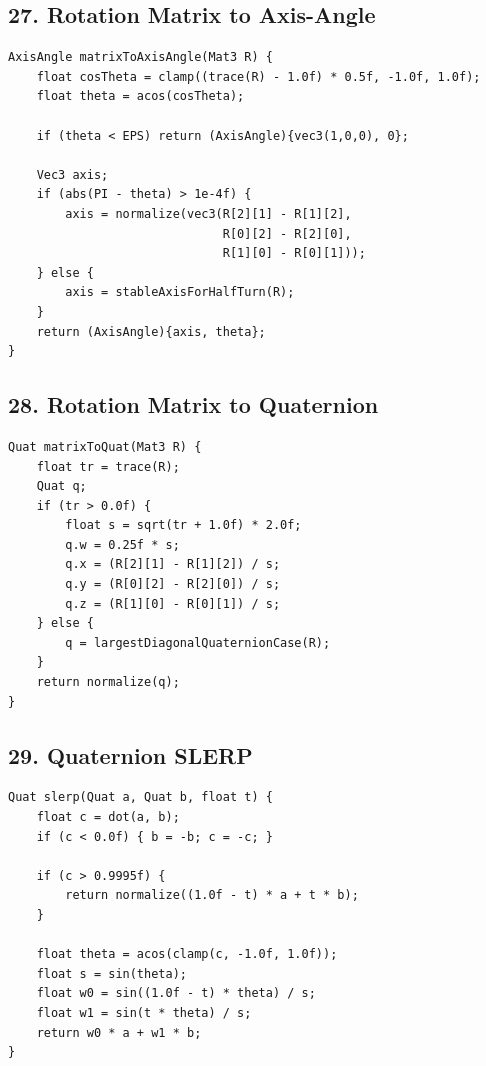 \documentclass[10pt,letterpaper]{article}
\begin{document}
\subsection{27. Rotation Matrix to Axis-Angle}

\begin{verbatim}
AxisAngle matrixToAxisAngle(Mat3 R) {
    float cosTheta = clamp((trace(R) - 1.0f) * 0.5f, -1.0f, 1.0f);
    float theta = acos(cosTheta);

    if (theta < EPS) return (AxisAngle){vec3(1,0,0), 0};

    Vec3 axis;
    if (abs(PI - theta) > 1e-4f) {
        axis = normalize(vec3(R[2][1] - R[1][2],
                              R[0][2] - R[2][0],
                              R[1][0] - R[0][1]));
    } else {
        axis = stableAxisForHalfTurn(R);
    }
    return (AxisAngle){axis, theta};
}
\end{verbatim}

\subsection{28. Rotation Matrix to Quaternion}

\begin{verbatim}
Quat matrixToQuat(Mat3 R) {
    float tr = trace(R);
    Quat q;
    if (tr > 0.0f) {
        float s = sqrt(tr + 1.0f) * 2.0f;
        q.w = 0.25f * s;
        q.x = (R[2][1] - R[1][2]) / s;
        q.y = (R[0][2] - R[2][0]) / s;
        q.z = (R[1][0] - R[0][1]) / s;
    } else {
        q = largestDiagonalQuaternionCase(R);
    }
    return normalize(q);
}
\end{verbatim}

\subsection{29. Quaternion SLERP}

\begin{verbatim}
Quat slerp(Quat a, Quat b, float t) {
    float c = dot(a, b);
    if (c < 0.0f) { b = -b; c = -c; }

    if (c > 0.9995f) {
        return normalize((1.0f - t) * a + t * b);
    }

    float theta = acos(clamp(c, -1.0f, 1.0f));
    float s = sin(theta);
    float w0 = sin((1.0f - t) * theta) / s;
    float w1 = sin(t * theta) / s;
    return w0 * a + w1 * b;
}
\end{verbatim}
\end{document}
